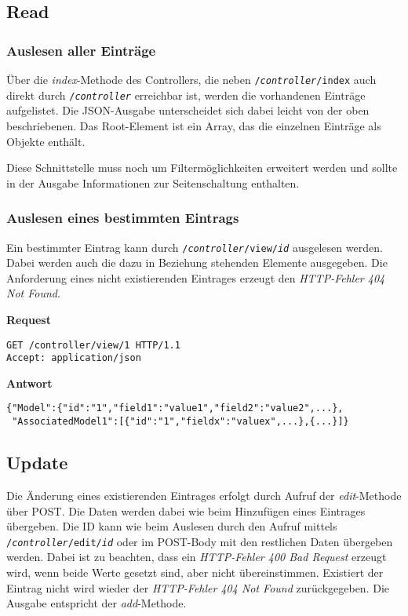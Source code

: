 \documentclass[a4paper,11pt]{article}
\newenvironment{code}[1][]{\smallskip\noindent\textbf{#1}}{}
\begin{document}
\subsection{Read}

\subsubsection{Auslesen aller Einträge}

Über die \emph{index}-Methode des Controllers, die neben \texttt{/\emph{controller}/index} auch direkt durch \texttt{/\emph{controller}} erreichbar ist, werden die vorhandenen Einträge aufgelistet.
Die JSON-Ausgabe unterscheidet sich dabei leicht von der oben beschriebenen. Das Root-Element ist ein Array, das die einzelnen Einträge als Objekte enthält.

Diese Schnittstelle muss noch um Filtermöglichkeiten erweitert werden und sollte in der Ausgabe Informationen zur Seitenschaltung enthalten.

\subsubsection{Auslesen eines bestimmten Eintrags}

Ein bestimmter Eintrag kann durch \texttt{/\emph{controller}/view/\emph{id}} ausgelesen werden.
Dabei werden auch die dazu in Beziehung stehenden Elemente ausgegeben.
Die Anforderung eines nicht existierenden Eintrages erzeugt den \emph{HTTP-Fehler 404 Not Found}.

\begin{code}[Request]
\begin{lstlisting}
GET /controller/view/1 HTTP/1.1
Accept: application/json
\end{lstlisting}
\end{code}
\begin{code}[Antwort]
\begin{lstlisting}
{"Model":{"id":"1","field1":"value1","field2":"value2",...},
 "AssociatedModel1":[{"id":"1","fieldx":"valuex",...},{...}]}
\end{lstlisting}
\end{code}

\subsection{Update}

Die Änderung eines existierenden Eintrages erfolgt durch Aufruf der \emph{edit}-Methode über POST. Die Daten werden dabei wie beim Hinzufügen eines Eintrages übergeben. Die ID kann wie beim Auslesen durch den Aufruf mittels \texttt{/\emph{controller}/edit/\emph{id}} oder im POST-Body mit den restlichen Daten übergeben werden. Dabei ist zu beachten, dass ein \emph{HTTP-Fehler 400 Bad Request} erzeugt wird, wenn beide Werte gesetzt sind, aber nicht übereinstimmen. Existiert der Eintrag nicht wird wieder der \emph{HTTP-Fehler 404 Not Found} zurückgegeben.
Die Ausgabe entspricht der \emph{add}-Methode.
\end{document}
